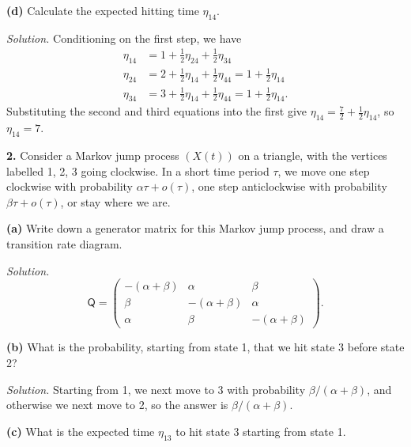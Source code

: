 \documentclass[
  a4paper,
]{article}
\theoremstyle{definition}
\theoremstyle{definition}
\theoremstyle{definition}
\theoremstyle{remark}
\begin{document}
\textbf{(d)} Calculate the expected hitting time \(\eta_{14}\).

\begin{myanswers}
\emph{Solution.}
Conditioning on the first step, we have
\begin{align*}
\eta_{14} &= 1 + \tfrac12 \eta_{24} + \tfrac12 \eta_{34} \\
\eta_{24} &= 2 + \tfrac12 \eta_{14} + \tfrac12 \eta_{44} = 1 + \tfrac12 \eta_{14} \\
\eta_{34} &= 3 + \tfrac12 \eta_{14} + \tfrac12 \eta_{44} = 1 + \tfrac12 \eta_{14} .
\end{align*}
Substituting the second and third equations into the first give \(\eta_{14} = \frac72 + \frac12 \eta_{14}\), so \(\eta_{14} = 7\).

\end{myanswers}

\textbf{2.} Consider a Markov jump process \((X(t))\) on a triangle, with the vertices labelled 1, 2, 3 going clockwise. In a short time period \(\tau\), we move one step clockwise with probability \(\alpha\tau + o(\tau)\), one step anticlockwise with probability \(\beta\tau + o(\tau)\), or stay where we are.

\textbf{(a)} Write down a generator matrix for this Markov jump process, and draw a transition rate diagram.

\begin{myanswers}
\emph{Solution.}
\[ \mathsf Q = \begin{pmatrix} -(\alpha + \beta) & \alpha & \beta \\\beta & -(\alpha + \beta) & \alpha \\ \alpha & \beta & -(\alpha + \beta) \end{pmatrix} . \]

\end{myanswers}

\textbf{(b)} What is the probability, starting from state 1, that we hit state 3 before state 2?

\begin{myanswers}
\emph{Solution.}
Starting from 1, we next move to 3 with probability \(\beta/(\alpha+\beta)\), and otherwise we next move to 2, so the answer is \(\beta/(\alpha+\beta)\).

\end{myanswers}

\textbf{(c)} What is the expected time \(\eta_{13}\) to hit state 3 starting from state 1.
\end{document}
